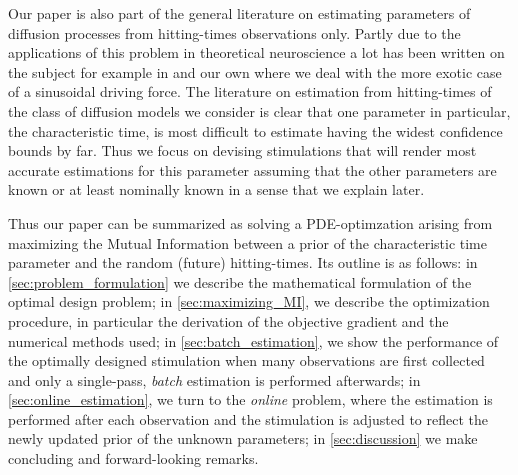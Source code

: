 \documentclass{article}
\begin{document}
Our paper is also part of the general literature on estimating parameters of
diffusion processes from hitting-times observations only. Partly due to the
applications of this problem in theoretical neuroscience a lot has been written
on the subject for example in
\cite{Ditlevsen2007,MullowneyIyengar2008,Alili2005} and our own \cite{Iolov2013} where we deal with the more exotic case of a sinusoidal driving force. The literature on estimation from hitting-times of the
class of diffusion models we consider is clear that one parameter in particular,
the characteristic time, is most difficult to estimate having the widest
confidence bounds by far. Thus we focus on devising stimulations that will
render most accurate estimations for this parameter assuming that the other
parameters are known or at least nominally known in a sense that we explain
later. 

Thus our paper can be summarized as solving a PDE-optimzation arising from
maximizing the Mutual Information between a prior of the characteristic time
parameter and the random (future) hitting-times. Its outline is as  follows:  in
\cref{sec:problem_formulation} we describe the mathematical formulation of the optimal design problem; in
\cref{sec:maximizing_MI}, we describe the optimization procedure, in particular
the derivation of the objective gradient and the numerical methods used; in
\cref{sec:batch_estimation}, we show the performance of the optimally designed
stimulation when many observations are first collected and only a single-pass,
{\sl batch} estimation is performed afterwards; in \cref{sec:online_estimation},
we turn to the {\sl online} problem, where the estimation is performed
after each observation and the stimulation is adjusted to reflect the newly
updated prior of the unknown parameters; in \cref{sec:discussion} we make
concluding and forward-looking remarks.

 
\end{document}
